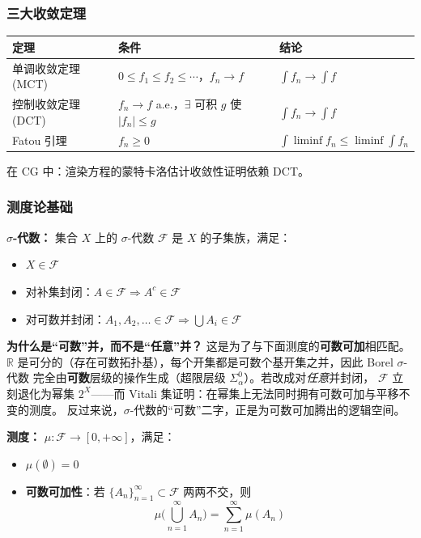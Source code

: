 \subsubsection{三大收敛定理}

\begin{center}
\begin{tabular}{L{3.5cm}L{5cm}L{4cm}}
\toprule
\textbf{定理} & \textbf{条件} & \textbf{结论} \\
\midrule
单调收敛定理 (MCT) & $0 \leq f_1 \leq f_2 \leq \cdots$，$f_n \to f$ & $\int f_n \to \int f$ \\
控制收敛定理 (DCT) & $f_n \to f$ a.e.，$\exists$ 可积 $g$ 使 $|f_n| \leq g$ & $\int f_n \to \int f$ \\
Fatou 引理 & $f_n \geq 0$ & $\int \liminf f_n \leq \liminf \int f_n$ \\
\bottomrule
\end{tabular}
\end{center}

在 CG 中：渲染方程的蒙特卡洛估计收敛性证明依赖 DCT。

\subsubsection{测度论基础}

\textbf{$\sigma$-代数：} 集合 $X$ 上的 $\sigma$-代数 $\mathcal{F}$ 是 $X$ 的子集族，满足：
\begin{itemize}
  \item $X \in \mathcal{F}$
  \item 对补集封闭：$A \in \mathcal{F} \Rightarrow A^c \in \mathcal{F}$
  \item 对可数并封闭：$A_1, A_2, \ldots \in \mathcal{F} \Rightarrow \bigcup A_i \in \mathcal{F}$
\end{itemize}

\textbf{为什么是“可数”并，而不是“任意”并？} 这是为了与下面测度的\textbf{可数可加}相匹配。
$\mathbb{R}$ 是可分的（存在可数拓扑基），每个开集都是可数个基开集之并，因此 Borel $\sigma$-代数
完全由\textbf{可数}层级的操作生成（超限层级 $\Sigma^0_\alpha$）。若改成对\emph{任意}并封闭，
$\mathcal{F}$ 立刻退化为幂集 $2^X$——而 Vitali 集证明：在幂集上无法同时拥有可数可加与平移不变的测度。
反过来说，$\sigma$-代数的“可数”二字，正是为可数可加腾出的逻辑空间。

\textbf{测度：} $\mu: \mathcal{F} \to [0, +\infty]$，满足：
\begin{itemize}
  \item $\mu(\emptyset) = 0$
  \item \textbf{可数可加性}：若 $\{A_n\}_{n=1}^\infty \subset \mathcal{F}$ 两两不交，则
  \[
  \mu\Big(\bigcup_{n=1}^\infty A_n\Big) = \sum_{n=1}^\infty \mu(A_n)
  \]
\end{itemize}

